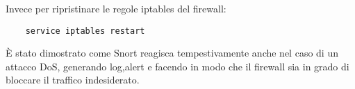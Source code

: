 Invece per ripristinare le regole iptables del firewall:

\begin{verbatim}
    service iptables restart
\end{verbatim}

È stato dimostrato come Snort reagisca tempestivamente anche nel caso di un attacco DoS, generando log,alert e facendo in modo che il firewall sia in grado di bloccare il traffico indesiderato.
